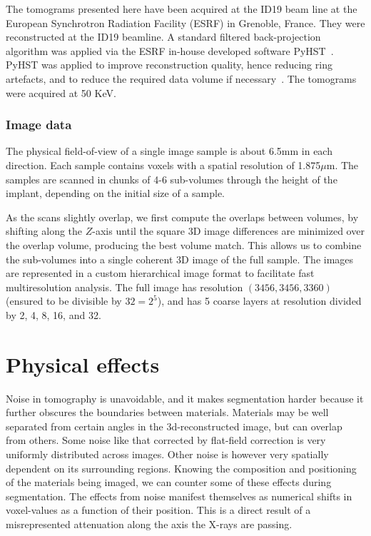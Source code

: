 \documentclass[pdflatex,sn-mathphys]{sn-jnl}%
\theoremstyle{thmstyleone}%
\theoremstyle{thmstyletwo}%
\theoremstyle{thmstylethree}%
\begin{document}
The tomograms presented here have been acquired at the ID19 beam line at the European Synchrotron
Radiation Facility (ESRF) in Grenoble, France. They were reconstructed\citep{sporring} at the ID19
beamline. A standard filtered back-projection algorithm was applied via the ESRF in-house developed
software PyHST~\citep{NELDAM2015682,pyhst}. PyHST was applied to improve reconstruction
quality, hence reducing ring artefacts, and to reduce the required data volume if
necessary~\cite{MIRONE201441}. The tomograms were acquired at 50 KeV.

\subsubsection{Image data}

The physical field-of-view of a single image sample is about 6.5mm in each direction. Each sample
contains voxels with a spatial resolution of 1.875$\mu$m. The samples are scanned in chunks of 4-6
sub-volumes through the height of the implant, depending on the initial size of a sample.

As the scans slightly overlap, we first compute the overlaps between
volumes, by shifting along the $Z$-axis until the square 3D image
differences are minimized over the overlap volume, producing the best
volume match. This allows us to combine the sub-volumes into a single coherent 3D image of the full sample.
The images are represented in a custom hierarchical image format to facilitate fast multiresolution analysis.
The full image has resolution $(3456,3456,3360)$ (ensured to be divisible by $32=2^5$), and
has 5 coarse layers at resolution divided by 2, 4, 8, 16, and 32.


\section{Physical effects}
\label{sec:physics}

Noise in tomography is unavoidable, and it makes segmentation harder because it further obscures the
boundaries between materials. Materials may be well separated from certain angles in the
3d-reconstructed image, but can overlap from others. Some noise like that corrected by flat-field
correction is very uniformly distributed across images. Other noise is however very spatially
dependent on its surrounding regions. Knowing the composition and positioning of the materials being
imaged, we can counter some of these effects during segmentation. The effects from noise manifest
themselves as numerical shifts in voxel-values as a function of their position. This is a direct
result of a misrepresented attenuation along the axis the X-rays are passing.
\end{document}

